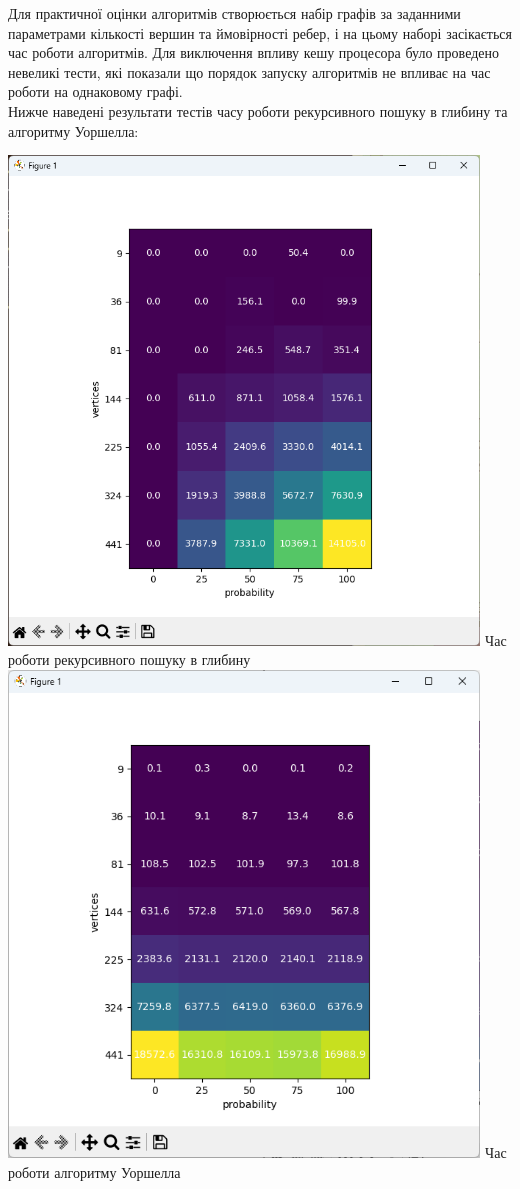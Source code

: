 \documentclass{article}
\begin{document}
Для практичної оцінки алгоритмів створюється набір графів за заданними параметрами кількості вершин та ймовірності ребер, і на цьому наборі засікається час роботи алгоритмів. Для виключення впливу кешу процесора було проведено невеликі тести, які показали що порядок запуску алгоритмів не впливає на час роботи на однаковому графі.\\\indent
Нижче наведені результати тестів часу роботи рекурсивного пошуку в глибину та алгоритму Уоршелла:
\begin{center}
    \includegraphics[width=125mm]{dfs_2}
    Час роботи рекурсивного пошуку в глибину
    \includegraphics[width=125mm]{w_2}
    Час роботи алгоритму Уоршелла
\end{center}
\end{document}
